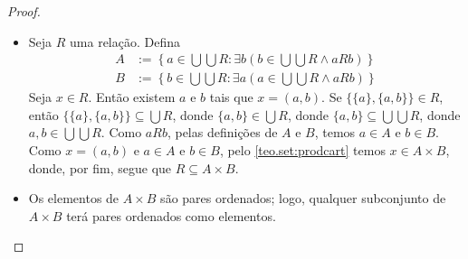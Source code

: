 \begin{proof}
    \leavevmode
        \begin{itemize}[align=left]
            \item[($\Rightarrow$)] Seja $R$ uma relação. Defina
                \begin{align*}
                    A &:= \left\{ a \in \bigcup \bigcup R : \exists b \left(b \in \bigcup \bigcup R \land aRb \right) \right\} \\
                    B &:= \left\{ b \in \bigcup \bigcup R : \exists a \left(a \in \bigcup \bigcup R \land aRb \right) \right\}
                \end{align*}
            Seja $x \in R$. Então existem $a$ e $b$ tais que $x = (a,b)$. Se $\{ \{a \}, \{a,b \} \} \in R$, então $\{ \{a \}, \{a,b \} \} \subseteq \bigcup R$, donde $\{a,b \} \in \bigcup R$, donde $\{ a,b \} \subseteq \bigcup \bigcup R$, donde $a,b \in \bigcup \bigcup R$. Como $aRb$, pelas definições de $A$ e $B$, temos $a \in A$ e $b \in B$. Como $x = (a,b)$ e $a \in A$ e $b \in B$, pelo \cref{teo.set:prodcart} temos $x \in A \times B$, donde, por fim, segue que $R \subseteq A \times B$.
            \item[($\Leftarrow$)] Os elementos de $A \times B$ são pares ordenados; logo, qualquer subconjunto de $A \times B$ terá pares ordenados como elementos.
        \end{itemize}
    \blackproof
\end{proof}

